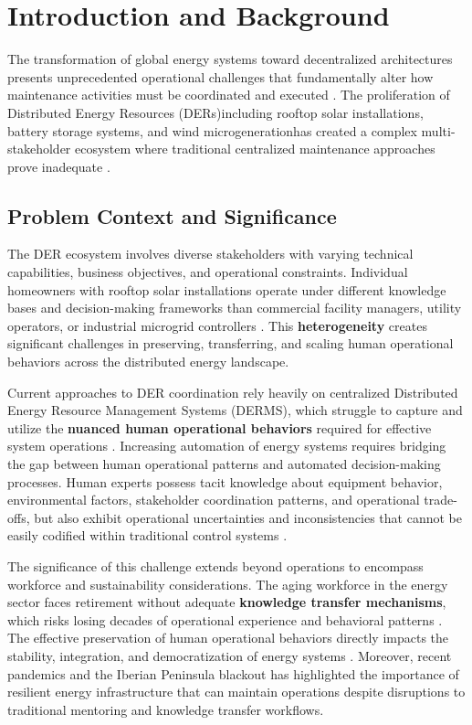 \documentclass[12pt,a4paper]{article}
\newcommand{\emdash}{\textemdash}
\begin{document}
\newpage

\clearpage

\section{Introduction and Background}
\label{sec:introduction}

The transformation of global energy systems toward decentralized architectures presents unprecedented operational challenges that fundamentally alter how maintenance activities must be coordinated and executed \cite{10.1109/ACCESS.2024.3387400}. The proliferation of Distributed Energy Resources (DERs)\emdash{}including rooftop solar installations, battery storage systems, and wind microgeneration\emdash{}has created a complex multi-stakeholder ecosystem where traditional centralized maintenance approaches prove inadequate \cite{10.1016/j.rser.2020.110607}.

\subsection{Problem Context and Significance}

The DER ecosystem involves diverse stakeholders with varying technical capabilities, business objectives, and operational constraints. Individual homeowners with rooftop solar installations operate under different knowledge bases and decision-making frameworks than commercial facility managers, utility operators, or industrial microgrid controllers \cite{10.1016/j.seta.2022.102837}. This \textbf{heterogeneity} creates significant challenges in preserving, transferring, and scaling human operational behaviors across the distributed energy landscape.

Current approaches to DER coordination rely heavily on centralized Distributed Energy Resource Management Systems (DERMS), which struggle to capture and utilize the \textbf{nuanced human operational behaviors} required for effective system operations \cite{10.1049/iet-gtd.2019.1022}. Increasing automation of energy systems requires bridging the gap between human operational patterns and automated decision-making processes. Human experts possess tacit knowledge about equipment behavior, environmental factors, stakeholder coordination patterns, and operational trade-offs, but also exhibit operational uncertainties and inconsistencies that cannot be easily codified within traditional control systems \cite{10.1080/095281300146308}.

The significance of this challenge extends beyond operations to encompass workforce and sustainability considerations. The aging workforce in the energy sector faces retirement without adequate \textbf{knowledge transfer mechanisms}, which risks losing decades of operational experience and behavioral patterns \cite{10.1109/ETFA61755.2024.10711109}. The effective preservation of human operational behaviors directly impacts the stability, integration, and democratization of energy systems \cite{10.3390/en14154579}. Moreover, recent pandemics and the Iberian Peninsula blackout has highlighted the importance of resilient energy infrastructure that can maintain operations despite disruptions to traditional mentoring and knowledge transfer workflows.
\end{document}
